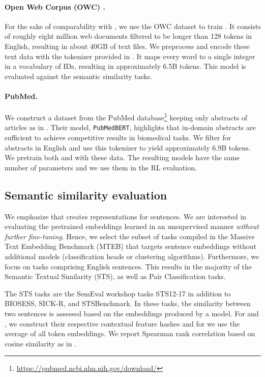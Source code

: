 \paragraph{Open Web Corpus (OWC) \cite{openweb}.}
For the sake of comparability with \cite{flyvec}, we use the OWC dataset to train \methodname.
It consists of roughly eight million web documents filtered to be longer than 128 tokens in English, resulting in about 40GB of text files.
We preprocess and encode these text data with the \flyvec tokenizer provided in \cite{flyvec}.
It maps every word to a single integer in a vocabulary of  IDs, resulting in approximately 6.5B tokens.
This model is evaluated against the semantic similarity tasks.

\paragraph{PubMed.}
We construct a dataset from the PubMed database\footnote{\url{https://pubmed.ncbi.nlm.nih.gov/download/}} keeping only abstracts of articles as in \cite{pubmedbert}.
Their model, \texttt{PubMedBERT}, highlights that in-domain abstracts are sufficient to achieve competitive results in biomedical tasks.
We filter for abstracts in English and use this tokenizer to yield approximately 6.9B tokens.
We pretrain both \pflyvec and \methodname with these data.
The resulting models have the same number of parameters and we use them in the RL evaluation. 

\subsection{Semantic similarity evaluation}
We emphasize that \methodname creates representations for sentences.
We are interested in evaluating the pretrained embeddings learned in an unsupervised manner \textit{without further fine-tuning}.
Hence, we select the subset of tasks compiled in the Massive Text Embedding Benchmark (MTEB) \cite{mteb} that targets sentence embeddings without additional models (classification heads or clustering algorithms).
Furthermore, we focus on tasks comprising English sentences. 
This results in the majority of the Semantic Textual Similarity (STS), as well as Pair Classification tasks.
\par
The STS tasks are the SemEval workshop tasks STS12-17 in addition to BIOSESS, SICK-R, and STSBenchmark.
In these tasks, the similarity between two sentences is assessed based on the embeddings produced by a model.
For \flyvec and \methodname, we construct their respective contextual feature hashes and for \bert we use the average of all token embeddings.
We report Spearman rank correlation based on cosine similarity as in \cite{reimers-etal-2016-task}.

